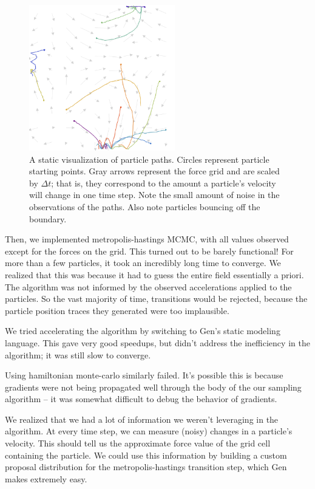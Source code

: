 \documentclass[11pt]{article}
\newcommand{\dt}[0]{\Delta t}
\begin{document}
\begin{figure}[htbp]
\centering
\includegraphics[width=2.5in]{./static.png}
\caption{\label{fig:static}A static visualization of particle paths. Circles represent particle starting points. Gray arrows represent the force grid and are scaled by \(\dt\); that is, they correspond to the amount a particle's velocity will change in one time step. Note the small amount of noise in the observations of the paths. Also note particles bouncing off the boundary.}
\end{figure}

Then, we implemented metropolis-hastings MCMC, with all values observed except for the forces on the grid. This turned out to be barely functional! For more than a few particles, it took an incredibly long time to converge. We realized that this was because it had to guess the entire field essentially a priori. The algorithm was not informed by the observed accelerations applied to the particles. So the vast majority of time, transitions would be rejected, because the particle position traces they generated were too implausible.

We tried accelerating the algorithm by switching to Gen's static modeling language. This gave very good speedups, but didn't address the inefficiency in the algorithm; it was still slow to converge.

Using hamiltonian monte-carlo similarly failed. It's possible this is because gradients were not being propagated well through the body of the our sampling algorithm -- it was somewhat difficult to debug the behavior of gradients.

We realized that we had a lot of information we weren't leveraging in the algorithm. At every time step, we can measure (noisy) changes in a particle's velocity. This should tell us the approximate force value of the grid cell containing the particle. We could use this information by building a custom proposal distribution for the metropolis-hastings transition step, which Gen makes extremely easy.
\end{document}
